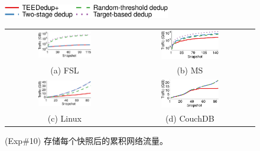 \begin{figure}[!htb]
    \centering
    \includegraphics[width=0.65\textwidth]{pic/featurespy/plot/bandwidth/upload_traffic_legend.pdf}     \vspace{3pt} \\
    \begin{tabular}{@{\ }c@{\ }c}
        \includegraphics[width=0.47\textwidth]{pic/featurespy/plot/bandwidth/upload_traffic_fsl.pdf} &
        \includegraphics[width=0.47\textwidth]{pic/featurespy/plot/bandwidth/upload_traffic_ms.pdf} \\
        {\small (a) FSL} & {\small (b) MS} \\
        \includegraphics[width=0.47\textwidth]{pic/featurespy/plot/bandwidth/upload_traffic_linux.pdf} &
        \includegraphics[width=0.47\textwidth]{pic/featurespy/plot/bandwidth/upload_traffic_couch.pdf} \\
        {\small (c) Linux} & {\small (d) CouchDB}
    \end{tabular}
    \caption{(Exp\#10) 存储每个快照后的累积网络流量。}
    \label{fig:featurespy-expNetworkTraffic}
\end{figure}

